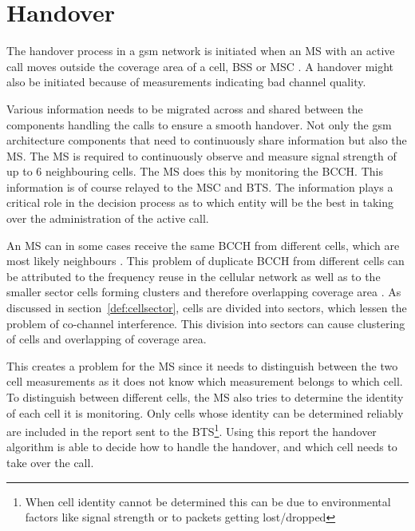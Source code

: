 \section{Handover}
\label{sec:handover}
The handover process in a \gls{gsm} network is initiated when an \gls{MS} with an active call moves outside the coverage area of a cell, \gls{BSS} or \gls{MSC} \cite{GSMArchitectureProtocolsServices,wirelesstelcoMullet,Eisenblatter}. A handover might also be initiated because of measurements indicating bad channel quality\cite{GSMArchitectureProtocolsServices}. 

Various information needs to be migrated across and shared between the components handling the calls to ensure a smooth handover. Not only the \gls{gsm} architecture components that need to continuously share information but also the \gls{MS}\@. The \gls{MS} is required to continuously observe and measure signal strength of up to 6 neighbouring cells. The \gls{MS} does this by monitoring the \gls{BCCH}\cite{GSMArchitectureProtocolsServices,wirelesstelcoMullet}. This information is of course relayed to the \gls{MSC} and \gls{BTS}. The information plays a critical role in the decision process as to which entity will be the best in taking over the administration of the active call\cite{GSMArchitectureProtocolsServices,wirelesstelcoMullet}.

An \gls{MS} can in some cases receive the same \gls{BCCH} from different cells, which are most likely neighbours \cite{GSMArchitectureProtocolsServices}. This problem of duplicate \gls{BCCH} from different cells can be attributed to the frequency reuse in the cellular network as well as to the smaller sector cells forming clusters and therefore overlapping coverage area \cite{GSMArchitectureProtocolsServices}. As discussed in section~\ref{def:cellsector}, cells are divided into sectors, which lessen the problem of co-channel interference. This division into sectors can cause clustering of cells and overlapping of coverage area.

This creates a problem for the \gls{MS} since it needs to distinguish between the two cell measurements as it does not know which measurement belongs to which cell\cite{GSMArchitectureProtocolsServices}. To distinguish between different cells, the \gls{MS} also tries to determine the identity of each cell it is monitoring. Only cells whose identity can be determined reliably are included in the report sent to the BTS\cite{Eisenblatter,GSMArchitectureProtocolsServices,wirelesstelcoMullet}\footnote{When cell identity cannot be determined this can be due to environmental factors like signal strength or to packets getting lost/dropped}. Using this report the handover algorithm is able to decide how to handle the handover, and which cell needs to take over the call\cite{Eisenblatter,GSMArchitectureProtocolsServices,wirelesstelcoMullet}.

